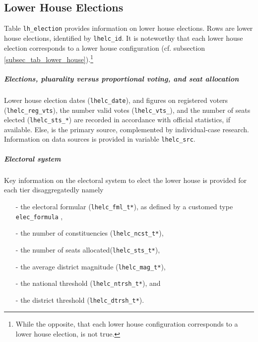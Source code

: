 \subsection{Lower House Elections}\label{subsec_tab_lh_election}

Table \texttt{lh\_election} provides information on lower house elections. 
Rows are lower house elections, identified by \texttt{lhelc\_id}. It is noteworthy that each lower house election corresponds to a lower house configuration (cf. subsection \ref{subsec_tab_lower_house}).\footnote{%
While the opposite, that each lower house configuration corresponds to a lower house election, is not true.}

\subparagraph{Elections, pluarality versus proportional voting, and seat allocation}
Lower house election dates (\texttt{lhelc\_date}), and figures on registered voters (\texttt{lhelc\_reg\_vts\*}), the number valid votes (\texttt{lhelc\_vts\_\*}), and the number of seats elected (\texttt{lhelc\_sts\_*}) are recorded in accordance with official statistics, if available. 
Else, \citet{Nohlen2001, Nohlen2005, Nohlen2010} is the primary source, complemented by individual-case research. Information on data sources is provided in variable \texttt{lhelc\_src}.

\subparagraph{Electoral system}
Key information on the electoral system to elect the lower house is provided for each tier disaggregatedly namely
\begin{itemize}%
\item[-]{the electoral formular (\texttt{lhelc\_fml\_t*}), as defined by a customed type \texttt{elec\_formula}
,}
\item[-]{the number of constituencies (\texttt{lhelc\_ncst\_t*}),}
\item[-]{the number of seats allocated(\texttt{lhelc\_sts\_t*}),}
\item[-]{the average district magnitude (\texttt{lhelc\_mag\_t*}),}
\item[-]{the national threshold (\texttt{lhelc\_ntrsh\_t*}), and}
\item[-]{the district threshold (\texttt{lhelc\_dtrsh\_t*}).}
\end{itemize}

